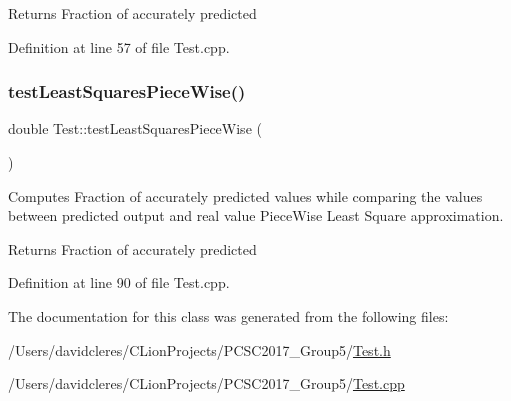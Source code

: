 \begin{DoxyReturn}{Returns}
Fraction of accurately predicted 
\end{DoxyReturn}


Definition at line 57 of file Test.\+cpp.

\mbox{\label{class_test_a617c228a5a5299a5a00d3905531ae203}} 
\subsubsection{\texorpdfstring{test\+Least\+Squares\+Piece\+Wise()}{testLeastSquaresPieceWise()}}
{\footnotesize\ttfamily double Test\+::test\+Least\+Squares\+Piece\+Wise (\begin{DoxyParamCaption}{ }\end{DoxyParamCaption})}



Computes Fraction of accurately predicted values while comparing the values between predicted output and real value Piece\+Wise Least Square approximation. 

\begin{DoxyReturn}{Returns}
Fraction of accurately predicted 
\end{DoxyReturn}


Definition at line 90 of file Test.\+cpp.



The documentation for this class was generated from the following files\+:\begin{DoxyCompactItemize}
\item 
/\+Users/davidcleres/\+C\+Lion\+Projects/\+P\+C\+S\+C2017\+\_\+\+Group5/\mbox{\hyperlink{_test_8h}{Test.\+h}}\item 
/\+Users/davidcleres/\+C\+Lion\+Projects/\+P\+C\+S\+C2017\+\_\+\+Group5/\mbox{\hyperlink{_test_8cpp}{Test.\+cpp}}\end{DoxyCompactItemize}
